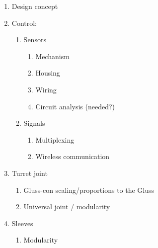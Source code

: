 \documentclass[11pt]{article}
\begin{document}
\begin{enumerate}
\item Design concept
\item Control:
  \begin{enumerate}
  \item Sensors
    \begin{enumerate}
    \item Mechanism
    \item Housing
    \item Wiring
    \item Circuit analysis (needed?)
    \end{enumerate}
  \item Signals
    \begin{enumerate}
    \item Multiplexing
    \item Wireless communication
    \end{enumerate}
  \end{enumerate}

\item Turret joint
  \begin{enumerate}
  \item Gluss-con scaling/proportions to the Gluss
  \item Universal joint / modularity
  \end{enumerate}
\item Sleeves
  \begin{enumerate}
  \item Modularity
  \end{enumerate}


\end{enumerate}
\end{document}
